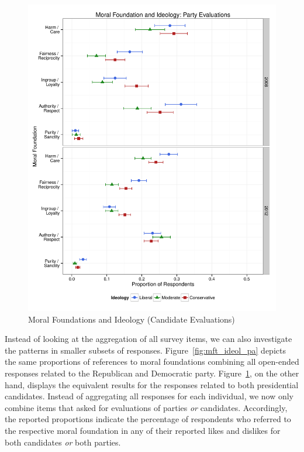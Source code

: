 \documentclass[12pt]{article}
\begin{document}
\begin{figure}\centering
\includegraphics[scale=.4]{../calc/fig/p3_mft_ideol_pa.pdf}
\caption{Moral Foundations and Ideology (Candidate Evaluations)}\label{fig:mft_ideol_ca}
\end{figure}

Instead of looking at the aggregation of all survey items, we can also investigate the patterns in smaller subsets of responses. Figure~\ref{fig:mft_ideol_pa} depicts the same proportions of references to moral foundations combining all open-ended responses related to the Republican and Democratic party. Figure~\ref{fig:mft_ideol_ca}, on the other hand, displays the equivalent results for the responses related to both presidential candidates. Instead of aggregating all responses for each individual, we now only combine items that asked for evaluations of parties \textit{or} candidates. Accordingly, the reported proportions indicate the percentage of respondents who referred to the respective moral foundation in any of their reported likes and dislikes for both candidates \textit{or} both parties.
\end{document}
